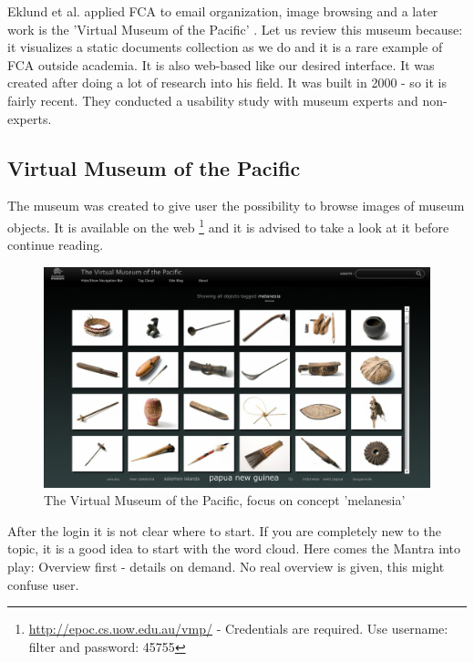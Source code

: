 \documentclass[11pt]{report}
\begin{document}
Eklund et al. applied FCA to email organization\cite{Eklund2004}, image browsing \cite{Ducrou2006,Ducrou2008} and a later work is the 'Virtual Museum of the Pacific' \cite{Eklund2009,Eklund2012}. Let us review this museum because: it visualizes a static documents collection as we do and it is a rare example of FCA outside academia. It is also web-based like our desired interface. It was created after doing a lot of research into his field. It was built in 2000 - so it is fairly recent. They conducted a usability study with museum experts and non-experts. \cite{Eklund2012}

\subsection{Virtual Museum of the Pacific}
 
The museum was created to give user the possibility to browse images of museum objects. It is available on the web \footnote{\url{http://epoc.cs.uow.edu.au/vmp/} - Credentials are required. Use username: filter and password: 45755} and it is advised to take a look at it before continue reading. \\

\begin{figure}[!ht]
	\centering
	\includegraphics[width=\linewidth]{images/pacific}
\caption{The Virtual Museum of the Pacific, focus on concept 'melanesia'}
\label{figure:pacific}
\end{figure}

After the login it is not clear where to start. If you are completely new to the topic, it is a good idea to start with the word cloud. Here comes the Mantra into play: Overview first - details on demand. No real overview is given, this might confuse user. \\
 
\end{document}
